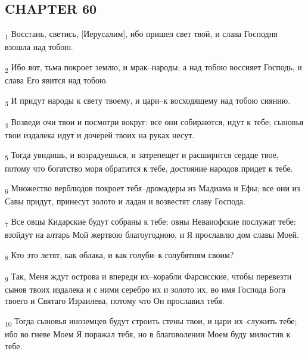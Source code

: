 \subsection{CHAPTER 60}
\begin{tcolorbox}
\textsubscript{1} Восстань, светись, [Иерусалим], ибо пришел свет твой, и слава Господня взошла над тобою.
\end{tcolorbox}
\begin{tcolorbox}
\textsubscript{2} Ибо вот, тьма покроет землю, и мрак--народы; а над тобою воссияет Господь, и слава Его явится над тобою.
\end{tcolorbox}
\begin{tcolorbox}
\textsubscript{3} И придут народы к свету твоему, и цари--к восходящему над тобою сиянию.
\end{tcolorbox}
\begin{tcolorbox}
\textsubscript{4} Возведи очи твои и посмотри вокруг: все они собираются, идут к тебе; сыновья твои издалека идут и дочерей твоих на руках несут.
\end{tcolorbox}
\begin{tcolorbox}
\textsubscript{5} Тогда увидишь, и возрадуешься, и затрепещет и расширится сердце твое, потому что богатство моря обратится к тебе, достояние народов придет к тебе.
\end{tcolorbox}
\begin{tcolorbox}
\textsubscript{6} Множество верблюдов покроет тебя--дромадеры из Мадиама и Ефы; все они из Савы придут, принесут золото и ладан и возвестят славу Господа.
\end{tcolorbox}
\begin{tcolorbox}
\textsubscript{7} Все овцы Кидарские будут собраны к тебе; овны Неваиофские послужат тебе: взойдут на алтарь Мой жертвою благоугодною, и Я прославлю дом славы Моей.
\end{tcolorbox}
\begin{tcolorbox}
\textsubscript{8} Кто это летят, как облака, и как голуби--к голубятням своим?
\end{tcolorbox}
\begin{tcolorbox}
\textsubscript{9} Так, Меня ждут острова и впереди их--корабли Фарсисские, чтобы перевезти сынов твоих издалека и с ними серебро их и золото их, во имя Господа Бога твоего и Святаго Израилева, потому что Он прославил тебя.
\end{tcolorbox}
\begin{tcolorbox}
\textsubscript{10} Тогда сыновья иноземцев будут строить стены твои, и цари их--служить тебе; ибо во гневе Моем Я поражал тебя, но в благоволении Моем буду милостив к тебе.
\end{tcolorbox}
